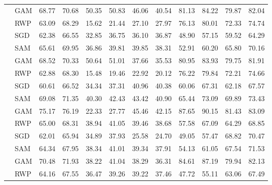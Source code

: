 \begin{table}[ht]
\begin{tabular}{@{}l l r r r r r r r r r r@{}}
 & GAM & 68.77 & 70.68 & 50.35 & 50.83 & 46.06 & 40.54 & 81.13 & 84.22 & 79.87 & 82.04 \\
 & RWP & 63.09 & 68.29 & 15.62 & 21.44 & 27.10 & 27.97 & 76.13 & 80.01 & 72.33 & 74.74 \\
\addlinespace[3pt]
\multirow{4}{*}{\textbf{OLoRA}} & SGD & 62.38 & 66.55 & 32.85 & 36.75 & 36.10 & 36.87 & 48.90 & 57.15 & 59.52 & 64.29 \\
 & SAM & 65.61 & 69.95 & 36.86 & 39.81 & 39.85 & 38.31 & 52.91 & 60.20 & 65.80 & 70.16 \\
 & GAM & 68.52 & 70.33 & 50.64 & 51.01 & 37.66 & 35.53 & 80.95 & 83.93 & 79.75 & 81.91 \\
 & RWP & 62.88 & 68.30 & 15.48 & 19.46 & 22.92 & 20.12 & 76.22 & 79.84 & 72.21 & 74.66 \\
\addlinespace[3pt]
\multirow{4}{*}{\textbf{InfLoRA}} & SGD & 60.61 & 66.52 & 34.34 & 37.31 & 40.96 & 40.38 & 60.06 & 67.31 & 62.18 & 67.57 \\
 & SAM & 69.08 & 71.35 & 40.30 & 42.43 & 43.42 & 40.90 & 65.44 & 73.09 & 69.89 & 73.43 \\
 & GAM & 75.17 & 76.19 & 22.33 & 27.77 & 45.46 & 42.15 & 87.65 & 90.15 & 81.43 & 83.09 \\
 & RWP & 65.00 & 68.31 & 38.94 & 41.05 & 39.46 & 38.68 & 57.58 & 67.09 & 64.29 & 68.85 \\
\addlinespace[3pt]
\multirow{4}{*}{\textbf{SDLoRA}} & SGD & 62.01 & 65.94 & 34.89 & 37.93 & 25.58 & 24.70 & 49.05 & 57.47 & 68.82 & 70.47 \\
 & SAM & 64.34 & 67.95 & 38.34 & 41.01 & 39.34 & 37.91 & 54.13 & 61.05 & 67.54 & 71.53 \\
 & GAM & 70.48 & 71.93 & 38.22 & 41.04 & 38.29 & 36.31 & 84.61 & 87.19 & 79.94 & 82.13 \\
 & RWP & 64.16 & 67.55 & 36.47 & 39.26 & 39.22 & 37.46 & 47.72 & 55.11 & 63.06 & 67.49 \\
\bottomrule
\end{tabular}
\end{table}